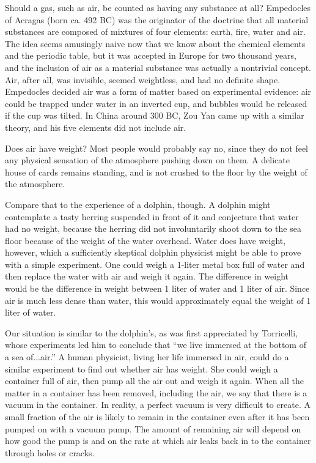 Should a gas, such as air, be counted as having any
substance at all?  Empedocles of Acragas (born ca. 492 BC)
was the originator of the doctrine that all material
substances are composed of mixtures of four elements: earth,
fire, water and air.  The idea seems amusingly naive now
that we know about the chemical elements and the periodic
table, but it was accepted in Europe for two thousand years,
and the inclusion of air as a material substance was
actually a nontrivial concept.  Air, after all, was
invisible, seemed weightless, and had no definite shape. 
Empedocles decided air was a form of matter based on
experimental evidence: air could be trapped under water in
an inverted cup, and bubbles would be released if the cup
was tilted.  In China around
300 BC, Zou Yan came up with a similar theory, and his five
elements did not include air.

Does air have weight?  Most people would probably say no,
since they do not feel any physical sensation of the
atmosphere pushing down on them.  A delicate house of cards
remains standing, and is not crushed to the floor by the
weight of the atmosphere.

Compare that to the experience of a dolphin, though.  A
dolphin might contemplate a tasty herring suspended in front
of it and conjecture that water had no weight, because the
herring did not involuntarily shoot down to the sea floor
because of the weight of the water overhead.  Water does
have weight, however, which a sufficiently skeptical dolphin
physicist might be able to prove with a simple experiment. 
One could weigh a 1-liter metal box full of water and then
replace the water with air and weigh it again.  The
difference in weight would be the difference in weight
between 1 liter of water and 1 liter of air.  Since air
is much less dense than water, this would approximately
equal the weight of 1 liter of water.

Our situation is similar to the dolphin's, as was first
appreciated by Torricelli, whose experiments led him to
conclude that ``we live immersed at the bottom of a sea
of...air.''  A human physicist, living her life immersed in
air, could do a similar experiment to find out whether air
has weight.  She could weigh a container full of air, then
pump all the air out and weigh it again.  When all the
matter in a container has been removed, including the air,
we say that there is a vacuum in the container.   In
reality, a perfect vacuum is very difficult to create.  A
small fraction of the air is likely to remain in the
container even after it has been pumped on with a vacuum
pump.  The amount of remaining air will depend on how good
the pump is and on the rate at which air leaks back in to
the container through holes or cracks.

